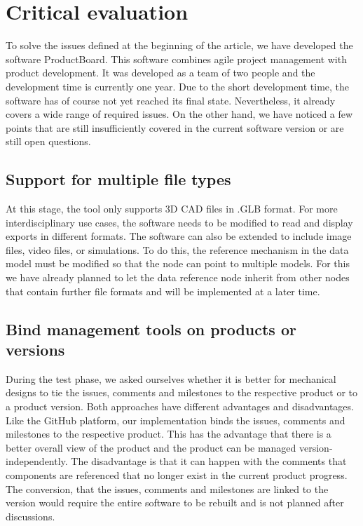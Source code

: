 \section{Critical evaluation}
\label{sec:evaluation}
To solve the issues defined at the beginning of the article, we have developed the software ProductBoard. This software combines agile project management with product development. It was developed as a team of two people and the development time is currently one year. Due to the short development time, the software has of course not yet reached its final state. Nevertheless, it already covers a wide range of required issues. On the other hand, we have noticed a few points that are still insufficiently covered in the current software version or are still open questions.

\subsection*{Support for multiple file types}
At this stage, the tool only supports 3D CAD files in .GLB format. For more interdisciplinary use cases, the software needs to be modified to read and display exports in different formats. The software can also be extended to include image files, video files, or simulations. To do this, the reference mechanism in the data model must be modified so that the node can point to multiple models. For this we have already planned to let the data reference node inherit from other nodes that contain further file formats and will be implemented at a later time.

\subsection*{Bind management tools on products or versions}
During the test phase, we asked ourselves whether it is better for mechanical designs to tie the issues, comments and milestones to the respective product or to a product version. Both approaches have different advantages and disadvantages. Like the GitHub platform, our implementation binds the issues, comments and milestones to the respective product. This has the advantage that there is a better overall view of the product and the product can be managed version-independently. The disadvantage is that it can happen with the comments that components are referenced that no longer exist in the current product progress. The conversion, that the issues, comments and milestones are linked to the version would require the entire software to be rebuilt and is not planned after discussions.

